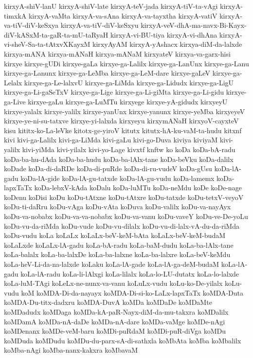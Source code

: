 {kirxyA-shiV-lanU
kirxyA-shiV-late
kirxyA-teV-jada
kirxyA-tiV-ta-vAgi
kirxyA-timxkA
kirxyA-vaMta
kirxyA-va-sAna
kirxyA-va-tayxtha
kirxyA-vatiV
kirxyA-va-tiV-diV-keSxya
kirxyA-va-tiV-diV-keSxyu
kirxyA-veV-dhA-ma-navx-Bi-Kayx-diV-kASxM-ta-gaR-ta-mU-taRyaH
kirxyA-vi-BU-tiya
kirxyA-vi-dhAna
kirxyA-vi-sheV-Sa-ta-tAtxvXKayxM
kirxyAyAM
kirxyA-yAshacx
kirxya-diM-da-lalxde
kirxya-mANA
kirxya-mANaH
kirxya-mANaM
kirxyateV
kirxya-va-garx-hisi
kirxye
kirxye-gUDi
kirxye-gaLa
kirxye-ga-Lalilx
kirxye-ga-LanUnx
kirxye-ga-Lanu
kirxye-ga-Lanunx
kirxye-ga-LeMba
kirxye-ga-LeM-dare
kirxye-gaLeV
kirxye-ga-Lelalx
kirxye-ga-Le-lalxvU
kirxye-ga-LiMda
kirxye-ga-Lidudx
kirxye-ga-LigU
kirxye-ga-Li-gaSeTxV
kirxye-ga-Lige
kirxye-ga-Li-giMta
kirxye-ga-Li-gidu
kirxye-ga-Live
kirxye-gaLu
kirxye-ga-LuMTu
kirxyege
kirxye-yA-gidudx
kirxyeyU
kirxye-yalalx
kirxye-yalilx
kirxye-yanUnx
kirxye-yanunx
kirxye-yeMba
kirxyeyeV
kirxye-ye-ni-su-tatxve
kirxye-yi-lalxda
kirxyeyu
kirxymANaH
kirxyoV-cayxteV
kisu
kititx-ko-La-leVke
kitotx-ge-yiroV
kitutx
kitutx-hA-ku-vaM-ta-hudu
kitxnf
kivi
kivi-ga-Lalilx
kivi-ga-LiMda
kivi-gaLu
kivi-go-Duva
kiviya
kiviyaM
kivi-yalilx
kivi-yiMda
kivi-yilalx
kivi-yo-Lage
kivxtf
knftw
ko
koDa
koDa-bA-radu
koDa-ba-hu-dAda
koDa-ba-hudu
koDa-ba-lAlx-tane
koDa-beVku
koDa-dalilx
koDade
koDa-di-daRDe
koDa-di-puRde
koDa-di-ru-vudeV
koDa-gUsu
koDa-lA-gadu
koDa-lA-gide
koDa-lA-gu-tatxde
koDa-lA-gu-vudu
koDa-lamemx
koDa-lapxTaTx
koDa-lebxV-kAda
koDalu
koDa-luMTu
koDa-neMdu
koDe
koDe-nage
koDenu
koDisi
koDu
koDu-tAtxne
koDu-tAtxre
koDu-tatxde
koDu-tetxV-veyoV
koDu-ti-daRru
koDu-vAga
koDu-vAta
koDuva
koDu-valilx
koDu-va-nayAyx
koDu-va-nobabx
koDu-va-va-nobabx
koDu-va-vanu
koDu-vaveY
koDu-ve-De-yoLu
koDu-vu-da-riMda
koDu-vude
koDu-vu-dilalx
koDu-vu-di-lalx-vA-du-da-riMda
koDu-vudu
koLa
koLaLx
koLaLx-beV-keM-bAta
koLaLx-beV-keM-budaM
koLaLxde
koLaLx-lA-gadu
koLa-bA-radu
koLa-baM-dudu
koLa-ba-lAlx-tane
koLa-balalx
koLa-ba-lalxDe
koLa-ba-lalxne
koLa-ba-lalxre
koLa-beV-keMdu
koLa-heV-Li-da-na-lalxde
koLaku
koLa-lA-gade
koLa-lA-ga-deM-budaM
koLa-lA-gadu
koLa-lA-radu
koLa-li-lAlxgi
koLa-lilalx
koLa-lo-LU-dutatx
koLa-lo-lalxde
koLa-luM-TAgi
koLeLx-ne-nunx-va-vanu
koLuLx-vudu
koLu-ko-De-yilalx
koLu-vudu
koM
koMDA-Di-da-nayayx
koMDA-Di-si-ko-LaLx-lapxTaTx
koMDA-Duta
koMDA-Du-titx-dadxru
koMDA-DuvA
koMDa
koMDaDe
koMDaMte
koMDadudx
koMDaga
koMDa-kA-paR-Nayx-diM-da-mu-takxra
koMDalilx
koMDamA
koMDa-nA-daDe
koMDa-nA-dare
koMDa-vaMge
koMDe-nAgi
koMDenanx
koMDe-veM-baru
koMDi-puRdaM
koMDi-puR-diVga
koMDu
koMDuda
koMDudu
koMDu-du-parx-sA-di-sathxla
koMbAta
koMba
koMbalilx
koMba-nAgi
koMba-nanx-kakxra
koMbavaM
}
